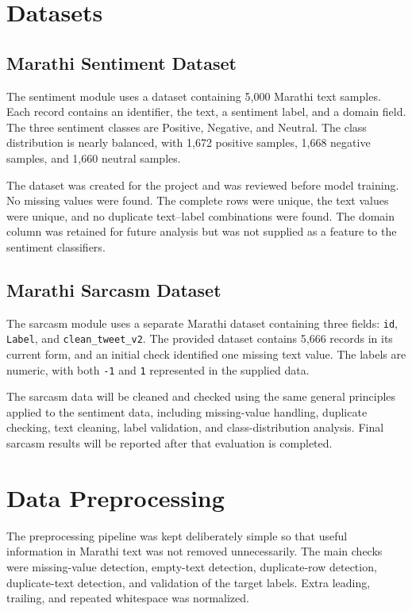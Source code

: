 \documentclass[11pt]{article}
\begin{document}
\section{Datasets}
\subsection{Marathi Sentiment Dataset}
The sentiment module uses a dataset containing 5,000 Marathi text samples. Each record contains an identifier, the text, a sentiment label, and a domain field. The three sentiment classes are Positive, Negative, and Neutral. The class distribution is nearly balanced, with 1,672 positive samples, 1,668 negative samples, and 1,660 neutral samples.

The dataset was created for the project and was reviewed before model training. No missing values were found. The complete rows were unique, the text values were unique, and no duplicate text--label combinations were found. The domain column was retained for future analysis but was not supplied as a feature to the sentiment classifiers.

\subsection{Marathi Sarcasm Dataset}
The sarcasm module uses a separate Marathi dataset containing three fields: \texttt{id}, \texttt{Label}, and \texttt{clean\_tweet\_v2}. The provided dataset contains 5,666 records in its current form, and an initial check identified one missing text value. The labels are numeric, with both \texttt{-1} and \texttt{1} represented in the supplied data. \citep{teammatedataset}

The sarcasm data will be cleaned and checked using the same general principles applied to the sentiment data, including missing-value handling, duplicate checking, text cleaning, label validation, and class-distribution analysis. Final sarcasm results will be reported after that evaluation is completed.

\section{Data Preprocessing}
The preprocessing pipeline was kept deliberately simple so that useful information in Marathi text was not removed unnecessarily. The main checks were missing-value detection, empty-text detection, duplicate-row detection, duplicate-text detection, and validation of the target labels. Extra leading, trailing, and repeated whitespace was normalized.
\end{document}
